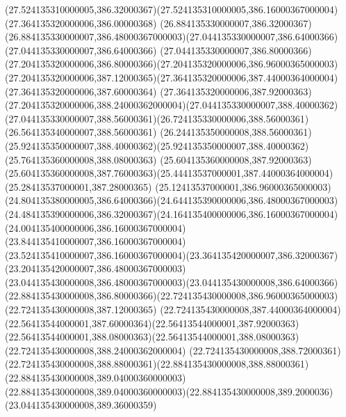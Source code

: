 {{	\curveto(27.524135310000005,386.32000367)(27.524135310000005,386.16000367000004)(27.364135320000006,386.00000368)
	\lineto(26.884135330000007,386.32000367)
	\curveto(26.884135330000007,386.48000367000003)(27.044135330000007,386.64000366)(27.044135330000007,386.64000366)
	\curveto(27.044135330000007,386.80000366)(27.204135320000006,386.80000366)(27.204135320000006,386.96000365000003)
	\curveto(27.204135320000006,387.12000365)(27.364135320000006,387.44000364000004)(27.364135320000006,387.60000364)
	\curveto(27.364135320000006,387.92000363)(27.204135320000006,388.24000362000004)(27.044135330000007,388.40000362)
	\curveto(27.044135330000007,388.56000361)(26.724135330000006,388.56000361)(26.564135340000007,388.56000361)
	\lineto(26.244135350000008,388.56000361)
	\curveto(25.924135350000007,388.40000362)(25.924135350000007,388.40000362)(25.764135360000008,388.08000363)
	\lineto(25.604135360000008,387.92000363)
	\curveto(25.604135360000008,387.76000363)(25.44413537000001,387.44000364000004)(25.28413537000001,387.28000365)
	\curveto(25.12413537000001,386.96000365000003)(24.804135380000005,386.64000366)(24.644135390000006,386.48000367000003)
	\curveto(24.484135390000006,386.32000367)(24.164135400000006,386.16000367000004)(24.004135400000006,386.16000367000004)
	\curveto(23.844135410000007,386.16000367000004)(23.524135410000007,386.16000367000004)(23.364135420000007,386.32000367)
	\curveto(23.204135420000007,386.48000367000003)(23.044135430000008,386.48000367000003)(23.044135430000008,386.64000366)
	\curveto(22.884135430000008,386.80000366)(22.724135430000008,386.96000365000003)(22.724135430000008,387.12000365)
	\curveto(22.724135430000008,387.44000364000004)(22.56413544000001,387.60000364)(22.56413544000001,387.92000363)
	\curveto(22.56413544000001,388.08000363)(22.56413544000001,388.08000363)(22.724135430000008,388.24000362000004)
	\lineto(22.724135430000008,388.72000361)
	\curveto(22.724135430000008,388.88000361)(22.884135430000008,388.88000361)(22.884135430000008,389.04000360000003)
	\curveto(22.884135430000008,389.04000360000003)(22.884135430000008,389.2000036)(23.044135430000008,389.36000359)
	\closepath
}
}
